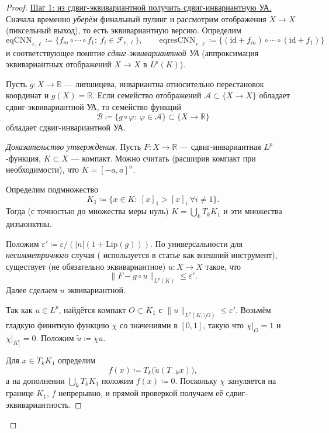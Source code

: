 \documentclass[../NDCNNAI_main.tex]{subfiles}
\begin{document}
\begin{proof}
\underline{Шаг 1: из сдвиг-эквивариантной получить сдвиг-инвариантную УА.}
Сначала временно \emph{уберём} финальный пулинг и рассмотрим отображения $X\to X$ (пиксельный выход), то есть эквивариантную версию.
Определим
\[
\mathrm{eqCNN}_{r,\ell}\coloneq \{f_m\circ\cdots\circ f_1:\ f_i\in\mathcal{F}_{r,\ell}\},\qquad
\mathrm{eqresCNN}_{r,\ell}\coloneq \{(\mathrm{id}+f_m)\circ\cdots\circ(\mathrm{id}+f_1)\}
\]
и соответствующее понятие \emph{сдвиг-эквивариантной УА} (аппроксимация эквивариантных отображений $X\to X$ в $L^p(K)$).

\begin{proposition}
\label{prop:pooling_bridge}
Пусть $g\colon X\to\mathbb{R}$ --- липшицева, инвариантна относительно перестановок координат и $g(X)=\mathbb{R}$.
Если семейство отображений $\mathcal{A}\subset\{X\to X\}$ обладает сдвиг-эквивариантной УА, то семейство функций
\[
\mathcal{B}\coloneq \{g\circ \varphi:\ \varphi\in\mathcal{A}\}\subset\{X\to\mathbb{R}\}
\]
обладает сдвиг-инвариантной УА.
\end{proposition}
\begin{proof}[Доказательство утверждения]
Пусть $F\colon X\to\mathbb{R}$ --- сдвиг-инвариантная $L^p$-функция, $K\subset X$ --- компакт.
Можно считать (расширив компакт при необходимости), что $K=[-a,a]^n$.

Определим подмножество
\[
K_1\coloneq \{x\in K:\ [x]_1>[x]_i\ \forall i\neq 1\}.
\]
Тогда (с точностью до множества меры нуль) $K=\bigcup_k T_k K_1$ и эти множества дизъюнктны.

Положим $\varepsilon'\coloneq \varepsilon/(|n|(1+\mathrm{Lip}(g)))$.
По универсальности для \emph{несимметричного} случая (\cite[Теорема 3.8]{Li_Lin_Shen2022} используется в статье как внешний инструмент),
существует (не обязательно эквивариантное) $u\colon X\to X$ такое, что
\begin{equation}
\|F-g\circ u\|_{L^p(K)}\le \varepsilon'.
\label{eq:bridge_27}
\end{equation}
Далее сделаем $u$ эквивариантной.

Так как $u\in L^p$, найдётся компакт $O\subset K_1$ с $\|u\|_{L^p(K_1\setminus O)}\le \varepsilon'$.
Возьмём гладкую финитную функцию $\chi$ со значениями в $[0,1]$, такую что $\chi|_O=1$ и $\chi|_{K_1^c}=0$.
Положим $\tilde u\coloneq \chi u$.

Для $x\in T_kK_1$ определим
\[
f(x)\coloneq T_k\bigl(\tilde u(T_{-k}x)\bigr),
\]
а на дополнении $\bigcup_k T_kK_1$ положим $f(x)\coloneq 0$.
Поскольку $\chi$ зануляется на границе $K_1$, $f$ непрерывно, и прямой проверкой получаем её сдвиг-эквивариантность.


\end{proof}
\end{proof}
\end{document}

